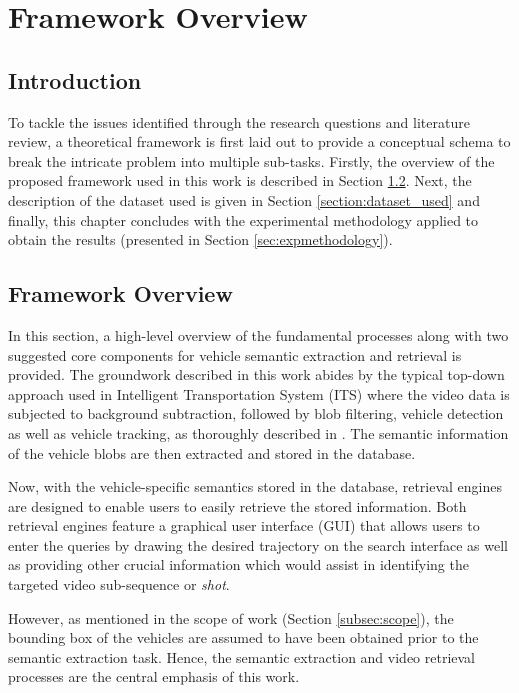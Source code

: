 \chapter{Framework Overview}
\label{chapter:framework}
\section{Introduction}
To tackle the issues identified through the research questions and literature review, a theoretical framework is first laid out to provide a conceptual schema to break the intricate problem into multiple sub-tasks. Firstly, the overview of the proposed framework used in this work is described in Section \ref{section:framework}. Next, the description of the dataset used is given in Section \ref{section:dataset_used} and finally, this chapter concludes with the experimental methodology applied to obtain the results (presented in Section \ref{sec:expmethodology}).


\section{Framework Overview}
\label{section:framework}
In this section, a high-level overview of the fundamental processes along with two suggested core components for vehicle semantic extraction and retrieval is provided.
The groundwork described in this work abides by the typical top-down approach used in Intelligent Transportation System (ITS) where the video data is subjected to background subtraction, followed by blob filtering, vehicle detection as well as vehicle tracking, as thoroughly described in \cite{lim2017}.
The semantic information of the vehicle blobs are then extracted and stored in the database.

Now, with the vehicle-specific semantics stored in the database, retrieval engines are designed to enable users to easily retrieve the stored information. Both retrieval engines feature a graphical user interface (GUI) that allows users to enter the queries by drawing the desired trajectory on the search interface as well as providing other crucial information which would assist in identifying the targeted video sub-sequence or \emph{shot}.

However, as mentioned in the scope of work (Section \ref{subsec:scope}), the bounding box of the vehicles are assumed to have been obtained prior to the semantic extraction task. Hence, the semantic extraction and video retrieval processes are the central emphasis of this work.

